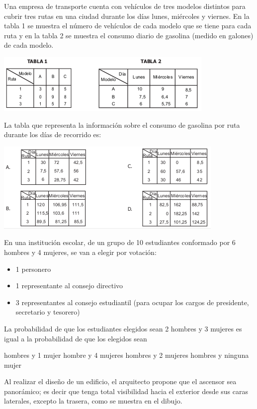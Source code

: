 \documentclass[10pt,addpoints]{exam}
\begin{document}
\begin{questions}
\question \label{q05} Una empresa de transporte cuenta con vehículos de tres modelos distintos para cubrir tres rutas en una ciudad durante los días lunes, miércoles y viernes. En la tabla 1 se muestra el número de vehículos de cada modelo que se tiene para cada ruta y en la tabla 2 se muestra el consumo diario de gasolina (medido en galones) de cada modelo.
\begin{center}
\includegraphics[scale=.8]{Images/tablas.png} 
\end{center}
La tabla que representa la información sobre el consumo de gasolina por ruta durante los días de recorrido es:
\begin{center}
\includegraphics[scale=.8]{Images/tablas01.png} 
\end{center}
\question \label{q06} En una institución escolar, de un grupo de 10 estudiantes conformado por 6 hombres y 4 mujeres, se van a elegir por votación:
\begin{itemize}
\item 1 personero
\item 1 representante al consejo directivo
\item 3 representantes al consejo estudiantil (para ocupar los cargos de presidente, secretario y tesorero)
\end{itemize}
La probabilidad de que los estudiantes elegidos sean 2 hombres y 3 mujeres es igual
a la probabilidad de que los elegidos sean
\begin{choices}
 hombres y 1 mujer
 hombre y 4 mujeres
 hombres y 2 mujeres
 hombres y ninguna mujer
\end{choices}
\question \label{q07} Al realizar el diseño de un edificio, el arquitecto propone que el ascensor sea panorámico; es decir que tenga total visibilidad hacia el exterior desde sus caras laterales, excepto la trasera, como se muestra en el dibujo.

\end{questions}
\end{document}
